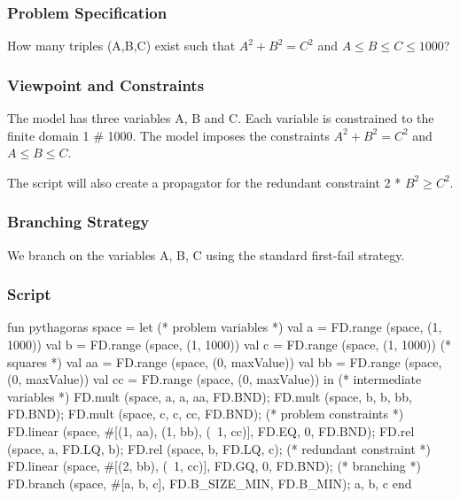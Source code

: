 \documentclass[a4paper,halfparskip]{scrartcl}
\begin{document}
\subsubsection{Problem Specification}
How many triples (A,B,C) exist such that $ A^2 + B^2 = C^2 $ 
and $ A \le B \le C \le 1000 $? 

\subsubsection{Viewpoint and Constraints}
The model has three variables A, B and C. Each variable is 
constrained to the finite domain 1 $\#$ 1000. The model imposes 
the constraints  $ A^2 + B^2 = C^2 $ and $ A \le B \le C $.

The script will also create a propagator for the redundant 
constraint 2 * $B^2 \ge C^2$. 

\subsubsection{Branching Strategy}
We branch on the variables A, B, C  using the standard 
first-fail strategy.

\subsubsection{Script}
\begin{myverbatim}
fun pythagoras space =
   let
      (* problem variables *)
      val a = FD.range (space, (1, 1000))
      val b = FD.range (space, (1, 1000))
      val c = FD.range (space, (1, 1000))
      (* squares *)
      val aa = FD.range (space, (0, maxValue))
      val bb = FD.range (space, (0, maxValue))
      val cc = FD.range (space, (0, maxValue))
   in
      (* intermediate variables *)
      FD.mult (space, a, a, aa, FD.BND);
      FD.mult (space, b, b, bb, FD.BND);
      FD.mult (space, c, c, cc, FD.BND);
      (* problem constraints *)
      FD.linear (space, #[(1, aa), (1, bb), (~1, cc)], FD.EQ, 0, FD.BND);
      FD.rel (space, a, FD.LQ, b);
      FD.rel (space, b, FD.LQ, c);
      (* redundant constraint *)
      FD.linear (space, #[(2, bb), (~1, cc)], FD.GQ, 0, FD.BND);
      (* branching *)
      FD.branch (space, #[a, b, c], FD.B_SIZE_MIN, FD.B_MIN);
      {a, b, c}
   end
\end{myverbatim}
\end{document}
